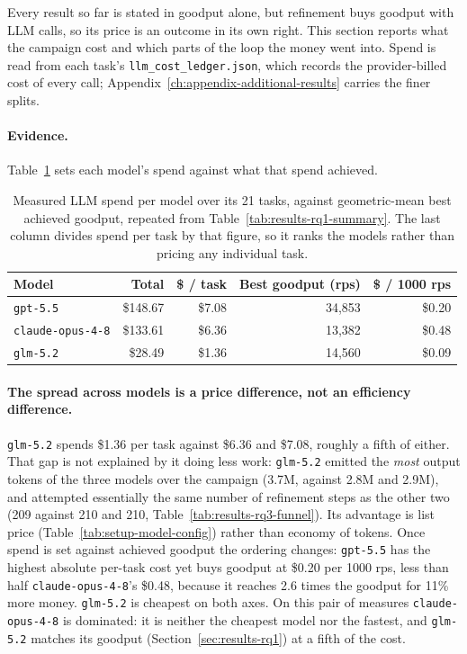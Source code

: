Every result so far is stated in goodput alone, but refinement buys
goodput with LLM calls, so its price is an outcome in its own right. This
section reports what the campaign cost and which parts of the loop the
money went into. Spend is read from each task's
\texttt{llm\_cost\_ledger.json}, which records the provider-billed cost of
every call; Appendix~\ref{ch:appendix-additional-results} carries the
finer splits.

\paragraph{Evidence.}
Table~\ref{tab:setup-model-cost} sets each model's spend against what that
spend achieved.

\begin{table}[htbp]
  \centering
  \caption{Measured LLM spend per model over its 21 tasks, against
    geometric-mean best achieved goodput, repeated from
    Table~\ref{tab:results-rq1-summary}. The last column divides spend per
    task by that figure, so it ranks the models rather than pricing any
    individual task.}
  \label{tab:setup-model-cost}
  \small
  \begin{tabular}{@{}lrrrr@{}}
    \toprule
    \textbf{Model} & \textbf{Total} & \textbf{\$ / task} & \textbf{Best goodput (rps)} & \textbf{\$ / 1000 rps} \\
    \midrule
    \texttt{gpt-5.5}         & \$148.67 & \$7.08 & 34{,}853 & \$0.20 \\
    \texttt{claude-opus-4-8} & \$133.61 & \$6.36 & 13{,}382 & \$0.48 \\
    \texttt{glm-5.2}         & \$28.49  & \$1.36 & 14{,}560 & \$0.09 \\
    \bottomrule
  \end{tabular}
\end{table}

\paragraph{The spread across models is a price difference, not an
efficiency difference.} \texttt{glm-5.2} spends \$1.36 per task against
\$6.36 and \$7.08, roughly a fifth of either. That gap is not explained by
it doing less work: \texttt{glm-5.2} emitted the \emph{most} output tokens
of the three models over the campaign (3.7M, against 2.8M and 2.9M), and
attempted essentially the same number of refinement steps as the other
two (209 against 210 and 210, Table~\ref{tab:results-rq3-funnel}). Its
advantage is list price
(Table~\ref{tab:setup-model-config}) rather than economy of tokens. Once
spend is set against achieved goodput the ordering changes: \texttt{gpt-5.5}
has the highest absolute per-task cost yet buys goodput at \$0.20 per
1000 rps, less than half \texttt{claude-opus-4-8}'s \$0.48, because it
reaches 2.6 times the goodput for 11\% more money.
\texttt{glm-5.2} is cheapest on both axes. On this pair of measures
\texttt{claude-opus-4-8} is dominated: it is neither the cheapest model
nor the fastest, and \texttt{glm-5.2} matches its goodput
(Section~\ref{sec:results-rq1}) at a fifth of the cost.

